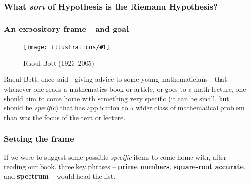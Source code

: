 \documentclass{beamer}
\newcommand{\ill}[3]{%
   \begin{figure}[H]%
   \vspace{-2ex}
   \centering%
   \texttt{[image: illustrations/\#1]}%
   \caption{#3}%
   \vspace{-2ex}
    \end{figure}}
\newcommand{\RH}{Riemann Hypothesis\index{Riemann Hypothesis}}
\begin{document}
\begin{frame}\frametitle{\bf\large What {\em sort} of Hypothesis is the \RH{}?}
 \begin{center}
       \end{center}
      \end{frame}
\begin{frame}\frametitle{An expository frame---and goal}\vskip10pt
\ill{raoulbott}{0.20}{Raoul Bott (1923--2005)\label{fig:bott}}

Raoul Bott, once
said---giving advice to some young mathematicians---that whenever one
reads a mathematics book or article, or goes to a math lecture, one
should aim to come home with something very specific (it can be small,
but should be {\em specific}) that has application to a wider class of
mathematical problem than was the focus of the text or lecture. 

\end{frame}

\begin{frame}\frametitle{Setting the frame}
 If we
were to suggest some possible {\em specific} items to come home with,
after reading our book, three key phrases -- {\bf prime numbers}, {\bf
  square-root accurate}, and {\bf spectrum} -- would head the
list.

\end{frame}
\end{document}
